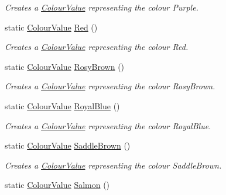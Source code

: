\begin{DoxyCompactItemize}
\begin{DoxyCompactList}\small\item\em Creates a \hyperlink{classMezzanine_1_1ColourValue}{ColourValue} representing the colour Purple. \item\end{DoxyCompactList}\item 
static \hyperlink{classMezzanine_1_1ColourValue}{ColourValue} \hyperlink{classMezzanine_1_1ColourValue_af898e5dba8591563a3ff438858f2cda2}{Red} ()
\begin{DoxyCompactList}\small\item\em Creates a \hyperlink{classMezzanine_1_1ColourValue}{ColourValue} representing the colour Red. \item\end{DoxyCompactList}\item 
static \hyperlink{classMezzanine_1_1ColourValue}{ColourValue} \hyperlink{classMezzanine_1_1ColourValue_ae27be7f04df420b31bd85d5146e44853}{RosyBrown} ()
\begin{DoxyCompactList}\small\item\em Creates a \hyperlink{classMezzanine_1_1ColourValue}{ColourValue} representing the colour RosyBrown. \item\end{DoxyCompactList}\item 
static \hyperlink{classMezzanine_1_1ColourValue}{ColourValue} \hyperlink{classMezzanine_1_1ColourValue_a52c43389bf782cc616df0b0d3ee1d621}{RoyalBlue} ()
\begin{DoxyCompactList}\small\item\em Creates a \hyperlink{classMezzanine_1_1ColourValue}{ColourValue} representing the colour RoyalBlue. \item\end{DoxyCompactList}\item 
static \hyperlink{classMezzanine_1_1ColourValue}{ColourValue} \hyperlink{classMezzanine_1_1ColourValue_ad9992a5ca30f18ab31f415fb052ec90d}{SaddleBrown} ()
\begin{DoxyCompactList}\small\item\em Creates a \hyperlink{classMezzanine_1_1ColourValue}{ColourValue} representing the colour SaddleBrown. \item\end{DoxyCompactList}\item 
static \hyperlink{classMezzanine_1_1ColourValue}{ColourValue} \hyperlink{classMezzanine_1_1ColourValue_a210edac1b89351c38dcfa63c2dca72e2}{Salmon} ()

\end{DoxyCompactItemize}
